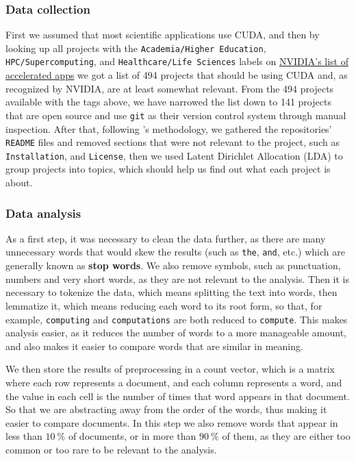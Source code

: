\documentclass[11pt, conference, onecolumn, final]{IEEEtran}
\begin{document}
\subsubsection{Data collection} \label{sec:methodology:statistics-data}

First we assumed that most scientific applications use CUDA, and then by
looking up all projects with the \verb|Academia/Higher Education|,
\verb|HPC/Supercomputing|, and \verb|Healthcare/Life Sciences| labels on
\href{https://nvidia.com/en-us/gpu-accelerated-applications}{NVIDIA's list of
accelerated apps} we got a list of 494 projects that should be using CUDA and,
as recognized by NVIDIA, are at least somewhat relevant.
From the 494 projects available with the tags above, we have narrowed the list
down to 141 projects that are open source and use \verb|git| as their version
control system through manual inspection.
After that, following \cite{zheng2018measuring}'s methodology, we gathered the
repositories' \verb|README| files and removed sections that were not relevant to
the project, such as \verb|Installation|, and \verb|License|, then
we used Latent Dirichlet Allocation (LDA) to group projects into topics, which
should help us find out what each project is about.

\subsubsection{Data analysis} \label{sec:methodology:statistics-analysis}

As a first step, it was necessary to clean the data further, as there are many
unnecessary words that would skew the results (such as \verb|the|, \verb|and|,
etc.) which are generally known as \textbf{stop words}.
We also remove symbols, such as punctuation, numbers and very short words, as
they are not relevant to the analysis.
Then it is necessary to tokenize the data, which means splitting the text into
words, then lemmatize it, which means reducing each word to its root form, so
that, for example, \verb|computing| and \verb|computations| are both reduced to
\verb|compute|.
This makes analysis easier, as it reduces the number of words to a more
manageable amount, and also makes it easier to compare words that are similar
in meaning.

We then store the results of preprocessing in a count vector, which is a matrix
where each row represents a document, and each column represents a word, and
the value in each cell is the number of times that word appears in that
document.
So that we are abstracting away from the order of the words, thus making it
easier to compare documents. In this step we also remove words that appear in
less than $\qty{10}{\percent}$ of documents, or in more than
$\qty{90}{\percent}$ of them, as they are either too common or too rare to be
relevant to the analysis.
\end{document}
